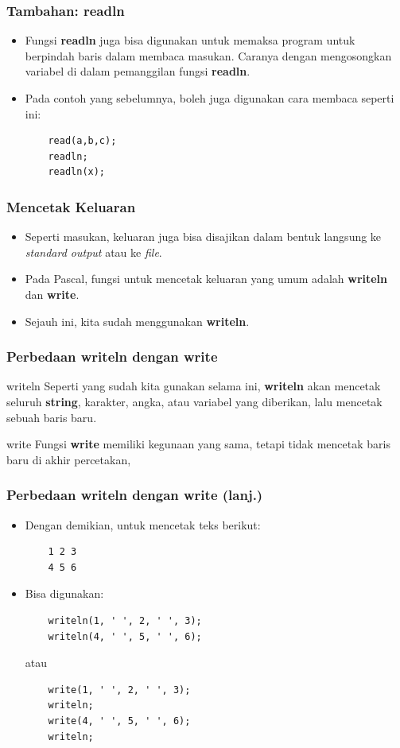 \documentclass{beamer}
\begin{document}
\begin{frame}[fragile]
\frametitle{Tambahan: readln}
\begin{itemize}
  \item Fungsi \textbf{readln} juga bisa digunakan untuk memaksa program untuk berpindah baris dalam membaca masukan. Caranya dengan mengosongkan variabel di dalam pemanggilan fungsi \textbf{readln}.
  \item Pada contoh yang sebelumnya, boleh juga digunakan cara membaca seperti ini:
  \begin{lstlisting}
    read(a,b,c);
    readln;
    readln(x);
  \end{lstlisting}
\end{itemize}
\end{frame}

\begin{frame}
\frametitle{Mencetak Keluaran}
\begin{itemize}
  \item Seperti masukan, keluaran juga bisa disajikan dalam bentuk langsung ke \textit{standard output} atau ke \textit{file}.
  \item Pada Pascal, fungsi untuk mencetak keluaran yang umum adalah \alert{\textbf{writeln}} dan \alert{\textbf{write}}.
  \item Sejauh ini, kita sudah menggunakan \textbf{writeln}.
\end{itemize}
\end{frame}

\begin{frame}[fragile]
\frametitle{Perbedaan writeln dengan write}
\begin{block}{writeln}
  Seperti yang sudah kita gunakan selama ini, \textbf{writeln} akan mencetak seluruh \textbf{string}, karakter, angka, atau variabel yang diberikan, lalu \alert{mencetak} sebuah baris baru.
\end{block}
\begin{block}{write}
  Fungsi \textbf{write} memiliki kegunaan yang sama, tetapi \alert{tidak mencetak} baris baru di akhir percetakan,
\end{block}
\end{frame}

\begin{frame}[fragile]
\frametitle{Perbedaan writeln dengan write (lanj.)}
\begin{itemize}
  \item Dengan demikian, untuk mencetak teks berikut:
  \begin{lstlisting}
    1 2 3
    4 5 6
  \end{lstlisting}
  \item Bisa digunakan:
  \begin{lstlisting}
    writeln(1, ' ', 2, ' ', 3);
    writeln(4, ' ', 5, ' ', 6);
  \end{lstlisting}
  atau
  \begin{lstlisting}
    write(1, ' ', 2, ' ', 3);
    writeln;
    write(4, ' ', 5, ' ', 6);
    writeln;
  \end{lstlisting}
\end{itemize}
\end{frame}
\end{document}
